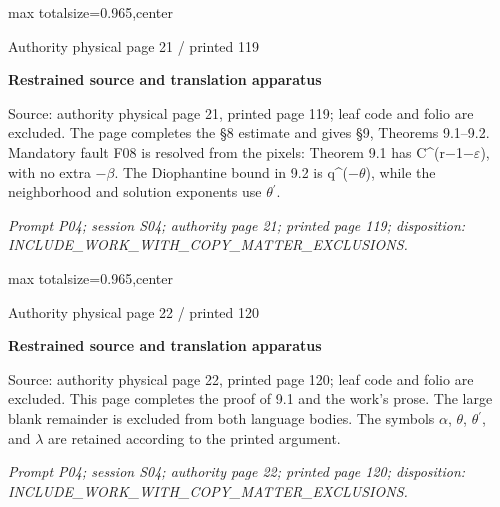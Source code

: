 \documentclass{article}
\begin{document}
\newpage
\noindent\begin{adjustbox}{max totalsize={\textwidth}{0.965\textheight},center}\begin{minipage}{\textwidth}
\noindent\hfill\scriptsize Authority physical page 21 / printed 119\par\normalsize
\textbf{Restrained source and translation apparatus}\par
Source: authority physical page 21, printed page 119; leaf code and folio are excluded. The page completes the §8 estimate and gives §9, Theorems 9.1–9.2. Mandatory fault F08 is resolved from the pixels: Theorem 9.1 has C\textasciicircum{}(r\ensuremath{-}1\ensuremath{-}\ensuremath{\varepsilon}), with no extra \ensuremath{-}\ensuremath{\beta}. The Diophantine bound in 9.2 is q\textasciicircum{}(\ensuremath{-}\ensuremath{\theta}), while the neighborhood and solution exponents use \ensuremath{\theta}\ensuremath{{}^{\prime}}.
\par\smallskip
\textit{Prompt P04; session S04; authority page 21; printed page 119; disposition: INCLUDE\_WORK\_WITH\_COPY\_MATTER\_EXCLUSIONS.}
\end{minipage}\end{adjustbox}

\newpage
\noindent\begin{adjustbox}{max totalsize={\textwidth}{0.965\textheight},center}\begin{minipage}{\textwidth}
\noindent\hfill\scriptsize Authority physical page 22 / printed 120\par\normalsize
\textbf{Restrained source and translation apparatus}\par
Source: authority physical page 22, printed page 120; leaf code and folio are excluded. This page completes the proof of 9.1 and the work’s prose. The large blank remainder is excluded from both language bodies. The symbols \ensuremath{\alpha}, \ensuremath{\theta}, \ensuremath{\theta}\ensuremath{{}^{\prime}}, and \ensuremath{\lambda} are retained according to the printed argument.
\par\smallskip
\textit{Prompt P04; session S04; authority page 22; printed page 120; disposition: INCLUDE\_WORK\_WITH\_COPY\_MATTER\_EXCLUSIONS.}
\end{minipage}\end{adjustbox}
\end{document}

